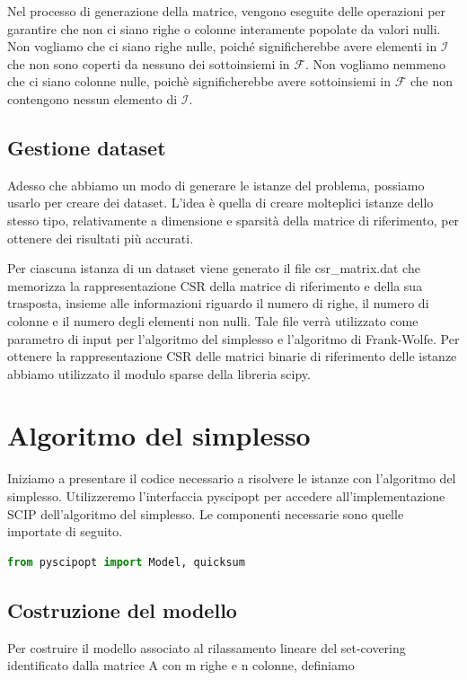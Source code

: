 Nel processo di generazione della matrice, vengono
eseguite delle operazioni per garantire che non ci siano righe o colonne interamente popolate da valori nulli. Non
vogliamo che ci siano righe nulle, poiché significherebbe avere elementi in
\(
    \mathcal{I}
\)
che non sono coperti da nessuno dei sottoinsiemi in \( \mathcal{F} \). Non vogliamo nemmeno che ci siano colonne nulle,
poichè significherebbe avere sottoinsiemi in \( \mathcal{F} \) che non contengono nessun elemento di \( \mathcal{I} \).

\subsection{Gestione dataset}
Adesso che abbiamo un modo di generare le istanze del problema, possiamo usarlo per creare dei dataset. L'idea è quella
di creare molteplici istanze dello stesso tipo, relativamente a dimensione e sparsità della matrice di riferimento, per
ottenere dei risultati più accurati.

Per ciascuna istanza di un dataset viene generato il file {\jbm csr\_matrix.dat} che memorizza la rappresentazione CSR
della matrice di riferimento e della sua trasposta, insieme alle informazioni riguardo il numero di righe, il numero di
colonne e il numero degli elementi non nulli. Tale file verrà utilizzato come parametro di input per l'algoritmo del
simplesso e l'algoritmo di Frank-Wolfe. Per ottenere la rappresentazione CSR delle matrici binarie di riferimento delle
istanze abbiamo utilizzato il modulo sparse della libreria scipy.


\section{Algoritmo del simplesso}
Iniziamo a presentare il codice necessario a risolvere le istanze con l'algoritmo del simplesso. Utilizzeremo
l'interfaccia pyscipopt per accedere all'implementazione SCIP dell'algoritmo del simplesso. Le componenti necessarie
sono quelle importate di seguito.

\begin{inline}
\begin{lstlisting}[style = style2, language=python]
from pyscipopt import Model, quicksum
\end{lstlisting}
\end{inline}

\subsection{Costruzione del modello}\label{sec:buildmodel}
Per costruire il modello associato al rilassamento lineare del set-covering identificato dalla matrice {\jbm A} con
{\jbm m} righe e {\jbm n} colonne, definiamo

